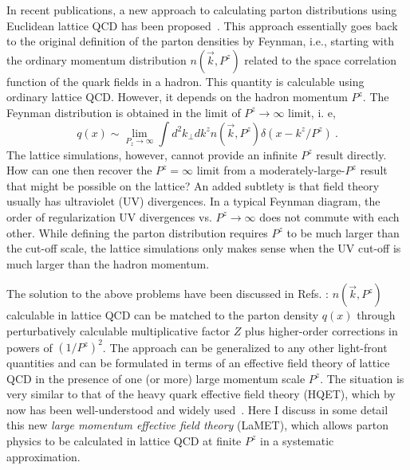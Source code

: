 \documentclass[aps,prd,preprint,tightenlines,superscriptaddress]{revtex4}
\begin{document}
In recent publications, a new approach to calculating parton distributions using Euclidean
lattice QCD has been proposed~\cite{Ji:2013fga, Ji:2013dva, Xiong:2013bka,Hatta:2013gta,Lin:2014zya}.
This approach essentially goes back to the original definition
of the parton densities by Feynman, i.e., starting with the ordinary momentum distribution $n(\vec{k}, P^z)$ 
related to the space correlation function of the quark fields in a hadron. This quantity
is calculable using ordinary lattice QCD. However,  it depends
on the hadron momentum $P^z$. The Feynman distribution is obtained in the limit of
$P^z\rightarrow \infty$ limit, i. e,
\begin{equation}
                q(x) \sim \lim_{P_z\rightarrow\infty} \int d^2k_\perp dk^z n(\vec{k},P^z)\delta (x-k^z/P^z) \ .
\end{equation}
The lattice simulations, however, cannot provide an infinite $P^z$ result directly.  
How can one then recover the $P^z=\infty$ limit from a moderately-large-$P^z$ result that might
be possible on the lattice?  An added subtlety is that field theory usually has ultraviolet (UV) divergences.
In a typical Feynman diagram, the order of regularization UV divergences vs. $P^z\rightarrow \infty$ does not
commute with each other. While defining the parton distribution requires $P^z$ to be much larger than the cut-off scale,
the lattice simulations only makes sense when the UV cut-off is much larger than the hadron momentum.

The solution to the above problems have been discussed in Refs. \cite{Ji:2013dva}: $n(\vec{k}, P^z)$
calculable in lattice QCD can be matched to the parton density $q(x)$ through perturbatively calculable
multiplicative factor $Z$ plus higher-order corrections in powers of $(1/P^z)^2$.
The approach can be generalized to any other light-front quantities and can be formulated in terms of
an effective field theory of lattice QCD in the presence of one (or more) large momentum scale $P^z$.
The situation is very similar to that of the heavy quark effective field theory (HQET), which by now
has been well-understood and widely used~\cite{Manohar:2000dt}.  Here I discuss in some detail
this new {\it large momentum effective field theory} (LaMET),  which allows parton physics to be calculated
in lattice QCD at finite $P^z$ in a systematic approximation.
\end{document}
